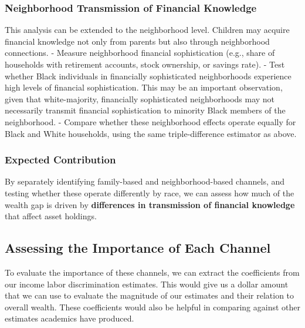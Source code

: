 \documentclass[
  12pt]{article}
\begin{document}
\subsubsection{Neighborhood Transmission of Financial
Knowledge}\label{neighborhood-transmission-of-financial-knowledge}

This analysis can be extended to the neighborhood level. Children may
acquire financial knowledge not only from parents but also through
neighborhood connections. - Measure neighborhood financial
sophistication (e.g., share of households with retirement accounts,
stock ownership, or savings rate). - Test whether Black individuals in
financially sophisticated neighborhoods experience high levels of
financial sophistication. This may be an important observation, given
that white-majority, financially sophisticated neighborhoods may not
necessarily transmit financial sophistication to minority Black members
of the neighborhood. - Compare whether these neighborhood effects
operate equally for Black and White households, using the same
triple-difference estimator as above.

\subsubsection{Expected Contribution}\label{expected-contribution-1}

By separately identifying family-based and neighborhood-based channels,
and testing whether these operate differently by race, we can assess how
much of the wealth gap is driven by \textbf{differences in transmission
of financial knowledge} that affect asset holdings.

\subsection{Assessing the Importance of Each
Channel}\label{assessing-the-importance-of-each-channel}

To evaluate the importance of these channels, we can extract the
coefficients from our income labor discrimination estimates. This would
give us a dollar amount that we can use to evaluate the magnitude of our
estimates and their relation to overall wealth. These coefficients would
also be helpful in comparing against other estimates academics have
produced.
\end{document}
